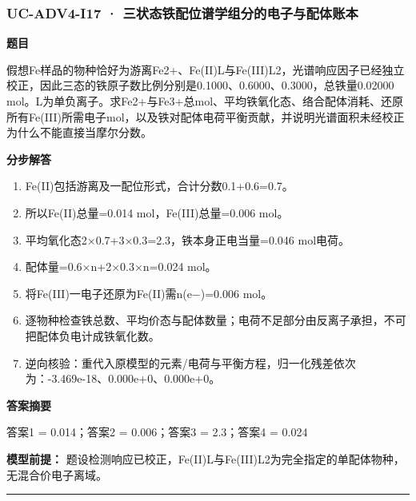 \documentclass[UTF8,11pt,a4paper]{ctexart}
\begin{document}
\subsubsection*{UC-ADV4-I17 · 三状态铁配位谱学组分的电子与配体账本}
\noindent\textbf{题目}\par
假想Fe样品的物种恰好为游离Fe2+、Fe(II)L与Fe(III)L2，光谱响应因子已经独立校正，因此三态的铁原子数比例分别是0.1000、0.6000、0.3000，总铁量0.02000 mol。L为单负离子。求Fe2+与Fe3+总mol、平均铁氧化态、络合配体消耗、还原所有Fe(III)所需电子mol，以及铁对配体电荷平衡贡献，并说明光谱面积未经校正为什么不能直接当摩尔分数。\par
\medskip\noindent\textbf{分步解答}
\begin{enumerate}
\item Fe(II)包括游离及一配位形式，合计分数0.1+0.6=0.7。
\item 所以Fe(II)总量=0.014 mol，Fe(III)总量=0.006 mol。
\item 平均氧化态2×0.7+3×0.3=2.3，铁本身正电当量=0.046 mol电荷。
\item 配体量=0.6×n+2×0.3×n=0.024 mol。
\item 将Fe(III)一电子还原为Fe(II)需n(e−)=0.006 mol。
\item 逐物种检查铁总数、平均价态与配体数量；电荷不足部分由反离子承担，不可把配体负电计成铁氧化数。
\item 逆向核验：重代入原模型的元素/电荷与平衡方程，归一化残差依次为：-3.469e-18、0.000e+0、0.000e+0。
\end{enumerate}
\noindent\textbf{答案摘要}\par
答案1 = 0.014；答案2 = 0.006；答案3 = 2.3；答案4 = 0.024\par
\noindent\textbf{模型前提：}
题设检测响应已校正，Fe(II)L与Fe(III)L2为完全指定的单配体物种，无混合价电子离域。\par
\medskip\hrule\medskip
{}
\end{document}
